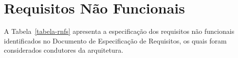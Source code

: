 \chapter{Requisitos Não Funcionais}
\label{sec-rnfs}
\vspace{-1cm}

A Tabela~\ref{tabela-rnfs} apresenta a especificação dos requisitos não funcionais identificados no Documento de Especificação de Requisitos, os quais foram considerados condutores da arquitetura.

\renewcommand*\thernfcount{RNF-\arabic{rnfcount}}
\newcommand*\RNF{\refstepcounter{rnfcount}\thernfcount}
\setcounter{rnfcount}{0}

